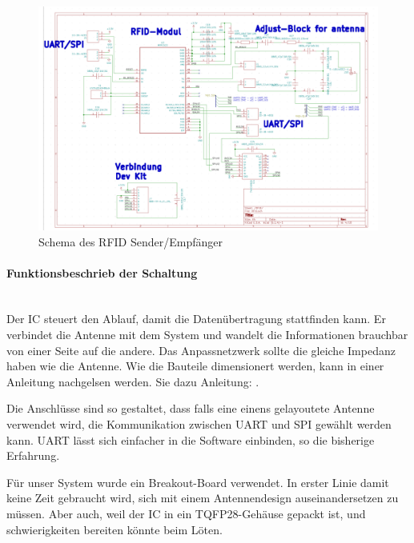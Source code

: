 \begin{figure}[!h]
\center
\includegraphics[width = \textwidth]{graphics/Schema_RFID}
\caption{Schema des RFID Sender/Empfänger}
\label{fig:Schema_RFID}
\end{figure}

\paragraph{Funktionsbeschrieb der Schaltung}\mbox{}\\

Der IC steuert den Ablauf, damit die Datenübertragung stattfinden kann. Er verbindet die Antenne mit dem System und wandelt die Informationen brauchbar von einer Seite auf die andere. Das Anpassnetzwerk sollte die gleiche Impedanz haben wie die Antenne. Wie die Bauteile dimensionert werden, kann in einer Anleitung nachgelsen werden. Sie dazu Anleitung: \cite{nxp_bv_2010_antenna_2010}.

Die Anschlüsse sind so gestaltet, dass falls eine einens gelayoutete Antenne verwendet wird, die Kommunikation zwischen UART und SPI gewählt werden kann. UART lässt sich einfacher in die Software einbinden, so die bisherige Erfahrung.

Für unser System wurde ein Breakout-Board verwendet. In erster Linie damit keine Zeit gebraucht wird, sich mit einem Antennendesign auseinandersetzen zu müssen. Aber auch, weil der IC in ein TQFP28-Gehäuse gepackt ist, und schwierigkeiten bereiten könnte beim Löten.